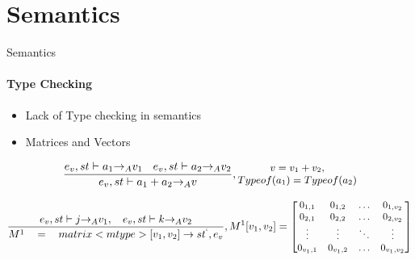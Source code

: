 \section{Semantics}

\begin{frame}{Semantics}
\framesubtitle{Type Checking}

\begin{itemize}
  \item Lack of Type checking in semantics
  \item Matrices and Vectors
\end{itemize}

\begin{equation}
\small
\frac { { e }_{ v },st\vdash { a }_{ 1 }{ \rightarrow  }_{ A }{ v }_{ 1 }\quad { e }_{ v },st\vdash { a }_{ 2 }{ \rightarrow  }_{ A }{ v }_{ 2 } }{ { e }_{ v },st\vdash { a }_{ 1 }+{ a }_{ 2 }{ \rightarrow  }_{ A }{ v } } ,\begin{matrix} v={ v }_{ 1 }+{ v }_{ 2 }, \\ Typeof({ a }_{ 1 }) = Typeof({ a }_{ 2 }) \end{matrix}
\end{equation}

\begin{equation}
\small
    \frac { { e }_{ v },st\vdash j{ \rightarrow  }_{ A }{ v }_{ 1 },\quad { e }_{ v },st\vdash k{ \rightarrow  }_{ A }{ v }_{ 2 } }{ { M }^{ 1 }\quad =\quad matrix<mtype>[{ v }_{ 1 },{ v }_{ 2 }]\rightarrow { st }^{ ` },{ e }_{ v } }  ,{ M }^{ 1 }[{ v }_{ 1 },{ v }_{ 2 }]= \begin{bmatrix} { { 0 }_{ 1,1 } } & 0_{ 1,2 } & \dots  & { 0 }_{ { 1,{ v }_{ 2 } } } \\ 0_{ 2,1 } & 0_{ 2,2 } & \dots  & 0_{ 2,v_{ 2 } } \\ \vdots  & \vdots  & \ddots  & \vdots  \\ { 0 }_{ { v }_{ 1 },1 } & 0_{ v_{ 1 },2 } & \dots  & { 0 }_{ { v }_{ 1 },{ v }_{ 2 } } \end{bmatrix}
\end{equation}

\end{frame}

